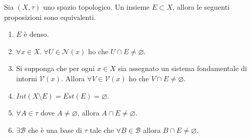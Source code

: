 \begin{theorem}
	\label{thr:dense_set_iff}
	Sia $(X,\tau)$ uno spazio topologico. Un insieme $E \subset X$, allora le seguenti proposizioni sono equivalenti.
	\begin{enumerate}
		\item $E$ è denso.
		\item $\forall x \in X . \; \forall U \in \mathcal{N}(x)$ ho che $U \cap E \neq \varnothing$.
		\item Si supponga che per ogni $x \in X$ sia assegnato un sistema fondamentale di intorni $\mathcal{V}(x)$. Allora $\forall V \in \mathcal{V}(x)$ ho che $V \cap E \neq \varnothing$.
		\item $Int(X \setminus E) = Est(E) = \varnothing$.
		\item $\forall A \in \tau$ dove $A \neq \varnothing$, allora $A \cap E \neq \varnothing$.
		\item $\exists \mathcal{B}$ che è una base di $\tau$ tale che $\forall B \in \mathcal{B}$ allora $B \cap E \neq \varnothing$.
	\end{enumerate}
\end{theorem}
